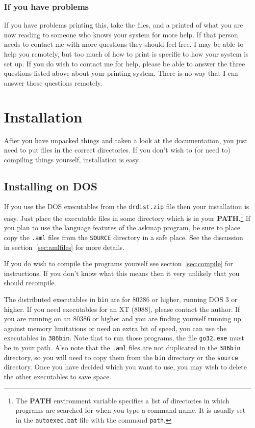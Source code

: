 \documentclass[%
	11pt,
        a4paper,
        twoside]{workrep}
\newcommand*{\prg}[1]{\textsf{#1}}		%
\newcommand*{\cmd}[1]{\texttt{#1}}		%
\newcommand*{\env}[1]{\textsf{\bfseries #1}}	%
\newcommand*{\file}[1]{\texttt{#1}}		%
\begin{document}
\subsubsection{If you have problems}

If you have problems printing this, take the files, and a printed
of what you are now reading to someone who knows your
system for more help.  If that person needs to contact me with
more questions they should feel free.  I may be able to help
you remotely, but too much of how to print is specific to how
your system is set up.  If you do wish to contact me for
help, please be able to answer the three questions listed above
about your printing system.  There is no way that I can answer those
questions remotely.


\section{Installation}

After you have unpacked things and taken a look at the documentation,
you just need to put files in the correct directories.  If you don't
wish to (or need to) compiling things yourself, installation is easy.

\subsection{Installing on DOS}

If you use the DOS executables from the \file{drdist.zip}
file then your installation
is easy.  Just place the executable files in some directory which is in
your \env{PATH}.\footnote{%
 The \env{PATH} environment variable specifies
 a list of directories in which programs are searched for when you type
 a command name.  It is usually set in the \file{autoexec.bat} file with
 the command \cmd{path}.}
If you plan to use the language features of the \prg{askmap} program, be
sure to place copy the \file{.aml} files from the \file{SOURCE} directory
in a safe place.  See the discussion in section~\ref{sec:amlfiles} for
more details.

If you do wish to compile the programs yourself
see section~\ref{sec:compile} for instructions.  If you don't know what
this means then it very unlikely that you should recompile.

The distributed executables in \file{bin}
are for 80286 or higher, running DOS 3 or
higher.  If you need executables for an XT (8088), please contact the
author.  If you are running on an 80386 or higher and you are finding
yourself running up against memory limitations or need an extra bit of
speed, you can use the executables in \file{386bin}.  Note that
to run those programs, the file \file{go32.exe} must be in your
path.  Also note that the \file{.aml} files are not duplicated
in the \file{386bin} directory, so you will need to copy them
from the \file{bin} directory or the \file{source} directory.
Once you have decided which you want to use, you may wish to
delete the other executables to save space.
\end{document}
